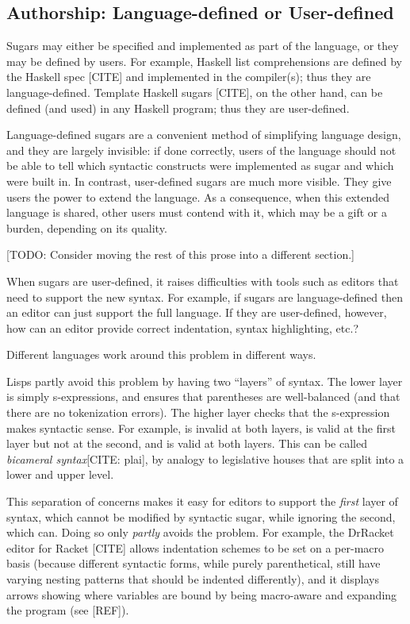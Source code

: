\subsection{Authorship: Language-defined or User-defined}

Sugars may either be specified and implemented as part of the
language, or they may be defined by users. For example, Haskell list
comprehensions are defined by the Haskell spec [CITE] and implemented
in the compiler(s); thus they are language-defined. Template Haskell
sugars [CITE], on the other hand, can be defined (and used) in any
Haskell program; thus they are user-defined.

Language-defined sugars are a convenient method of simplifying
language design, and they are largely invisible: if done correctly,
users of the language should not be able to tell which syntactic
constructs were implemented as sugar and which were built in.
In contrast, user-defined sugars are much more visible. They give
users the power to extend the language. As a consequence, when
this extended language is shared, other users must contend with it,
which may be a gift or a burden, depending on its quality.

[TODO: Consider moving the rest of this prose into a different section.]

When sugars are user-defined, it raises difficulties with tools such
as editors that need to support the new syntax. For example, if sugars
are language-defined then an editor can just support the full
language. If they are user-defined, however, how can an editor provide
correct indentation, syntax highlighting, etc.? %

Different languages work around this problem in different ways.

Lisps partly avoid this problem by having two ``layers'' of syntax.
The lower layer is simply s-expressions, and ensures that parentheses
are well-balanced (and that there are no tokenization errors).
The higher layer checks that the s-expression makes syntactic sense.
For example,  is invalid at both layers,
 is valid at the first layer but not at the
second, and  is valid at both layers.
This can be called \emph{bicameral syntax}[CITE: plai], by analogy to legislative
houses that are split into a lower and upper level.

This separation of concerns makes it easy for editors to support the
\emph{first} layer of syntax, which cannot be modified by syntactic
sugar, while ignoring the second, which can. Doing so only
\emph{partly} avoids the problem. For example, the DrRacket editor for
Racket [CITE] allows indentation schemes to be set on a per-macro
basis (because different syntactic forms, while purely parenthetical,
still have varying nesting patterns that should be indented
differently), and it displays arrows showing where variables are bound
by being macro-aware and expanding the program (see [REF]).

